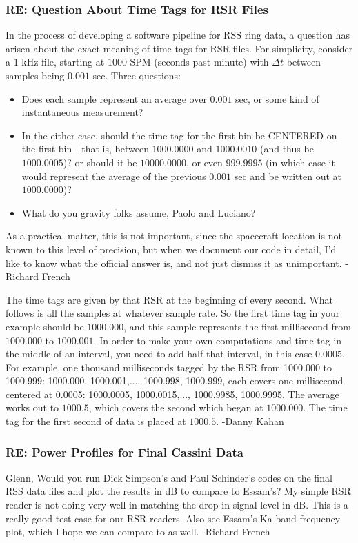 \documentclass[crop=false,class=article,oneside]{standalone}
\begin{document}
\subsubsection{\footnotesize RE: Question About Time Tags for RSR Files}
In the process of developing a software pipeline for RSS ring data, a question has arisen about the exact meaning of time tags for RSR files. For simplicity, consider a 1 kHz file, starting at $1000$ SPM (seconds past minute) with $\Delta t$ between samples being $0.001$ sec. Three questions:
\begin{itemize}
    \item Does each sample     represent an average over $0.001$ sec, or some kind of instantaneous measurement?
    \item In the either case, should the time tag for the first bin be CENTERED  on the first bin - that is, between $1000.0000$ and $1000.0010$ (and thus be $1000.0005$)? or should it be $10000.0000$, or even $999.9995$ (in which case it would represent the average of the previous $0.001$ sec and be written out at $1000.0000$)?
    \item What do you gravity folks assume, Paolo and Luciano?
\end{itemize}
As a practical matter, this is not important, since the spacecraft location is not known to this level of precision, but when we document our code in detail, I'd like to know what the official answer is, and not just dismiss it as unimportant. -Richard French\par
The time tags are given by that RSR at the beginning of every second. What follows is all the samples at whatever sample rate. So the first time tag in your example should be $1000.000$, and this sample represents the first millisecond from $1000.000$ to $1000.001$. In order to make your own computations and time tag in the middle of an interval, you need to add half that interval, in this case $0.0005$. For example, one thousand milliseconds tagged by the RSR from 1000.000 to 1000.999: 1000.000, 1000.001,..., 1000.998, 1000.999, each covers one millisecond centered at 0.0005: 1000.0005, 1000.0015,..., 1000.9985, 1000.9995. The average works out to $1000.5$, which covers the second which began at $1000.000$. The time tag for the first second of data is placed at $1000.5$. -Danny Kahan
\subsubsection{RE: Power Profiles for Final Cassini Data}
Glenn, Would you run Dick Simpson's and Paul Schinder's codes on the final RSS data files and plot the results in dB to compare to Essam's? My simple RSR reader is not doing very well in matching the drop in signal level in dB. This is a really good test case for our RSR readers. Also see Essam's Ka-band frequency plot, which I hope we can compare to as well. -Richard French
\end{document}
